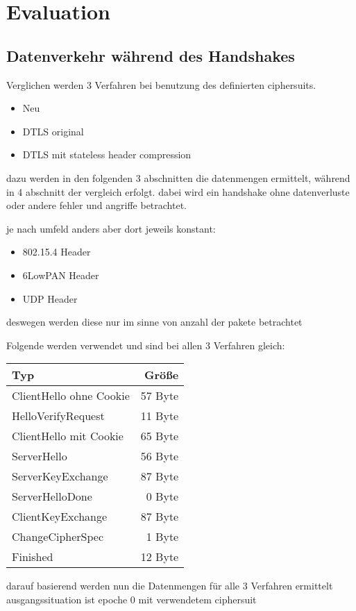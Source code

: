 \chapter{Evaluation}

\section{Datenverkehr während des Handshakes}

Verglichen werden 3 Verfahren bei benutzung des definierten ciphersuits.
\begin{itemize}
  \item Neu
  \item DTLS original
  \item DTLS mit stateless header compression
\end{itemize}
dazu werden in den folgenden 3 abschnitten die datenmengen ermittelt, während in 4 abschnitt der vergleich erfolgt.
dabei wird ein handshake ohne datenverluste oder andere fehler und angriffe betrachtet.

je nach umfeld anders aber dort jeweils konstant:
\begin{itemize}
  \item 802.15.4 Header
  \item 6LowPAN Header
  \item UDP Header
\end{itemize}
deswegen werden diese nur im sinne von anzahl der pakete betrachtet

Folgende werden verwendet und sind bei allen 3 Verfahren gleich:\\
\begin{tabular}{l|r}
  Typ & Größe\\
  \hline
  ClientHello ohne Cookie & 57 Byte\\
  HelloVerifyRequest      & 11 Byte\\
  ClientHello mit Cookie  & 65 Byte\\
  ServerHello             & 56 Byte\\
  ServerKeyExchange       & 87 Byte\\
  ServerHelloDone         &  0 Byte\\
  ClientKeyExchange       & 87 Byte\\
  ChangeCipherSpec        &  1 Byte\\
  Finished                & 12 Byte    
\end{tabular}

darauf basierend werden nun die Datenmengen für alle 3 Verfahren ermittelt\\
ausgangssituation ist epoche 0 mit verwendetem ciphersuit

